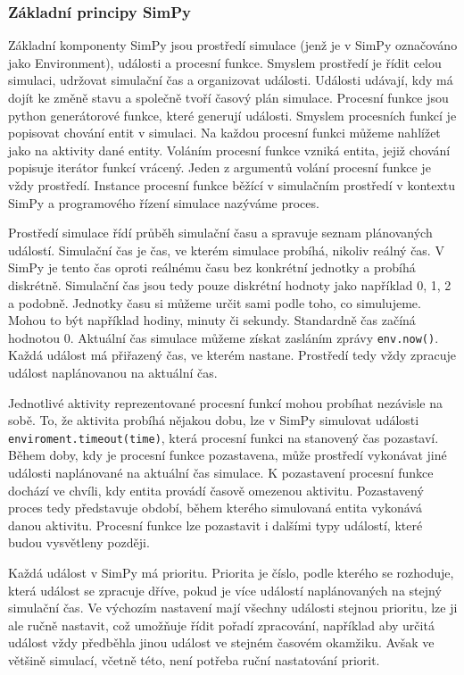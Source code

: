 \documentclass[
  program=itp,
  biblatex,
  figures=false,
  glossaries,
  index
]{kidiplom}
\begin{document}
\subsubsection{Základní principy SimPy}
Základní komponenty SimPy jsou prostředí simulace (jenž je v SimPy označováno jako Environment), události a procesní funkce. Smyslem prostředí je řídit celou simulaci, udržovat simulační čas a organizovat události. Události udávají, kdy má dojít ke změně stavu a společně tvoří časový plán simulace. Procesní funkce jsou python generátorové funkce, které generují události. Smyslem procesních funkcí je popisovat chování entit v simulaci. Na každou procesní funkci můžeme nahlížet jako na aktivity dané entity. Voláním procesní funkce vzniká entita, jejiž chování popisuje iterátor funkcí vrácený. Jeden z argumentů volání procesní funkce je vždy prostředí. Instance procesní funkce běžící v simulačním prostředí v kontextu SimPy a programového řízení simulace nazýváme proces.

Prostředí simulace řídí průběh simulační času a spravuje seznam plánovaných událostí. Simulační čas je čas, ve kterém simulace probíhá, nikoliv reálný čas. V SimPy je tento čas oproti reálnému času bez konkrétní jednotky a probíhá diskrétně. Simulační čas jsou tedy pouze diskrétní hodnoty jako například 0, 1, 2 a podobně. Jednotky času si můžeme určit sami podle toho, co simulujeme. Mohou to být například hodiny, minuty či sekundy. Standardně čas začíná hodnotou 0. Aktuální čas simulace můžeme získat zasláním zprávy \texttt{env.now()}. Každá událost má přiřazený čas, ve kterém nastane. Prostředí tedy vždy zpracuje událost naplánovanou na aktuální čas.

Jednotlivé aktivity reprezentované procesní funkcí mohou probíhat nezávisle na sobě. To, že aktivita probíhá nějakou dobu, lze v SimPy simulovat události \texttt{enviroment.timeout(time)}, která procesní funkci na stanovený čas pozastaví. Během doby, kdy je procesní funkce pozastavena, může prostředí vykonávat jiné události naplánované na aktuální čas simulace. K pozastavení procesní funkce dochází ve chvíli, kdy entita provádí časově omezenou aktivitu. Pozastavený proces tedy představuje období, během kterého simulovaná entita vykonává danou aktivitu. Procesní funkce lze pozastavit i dalšími typy událostí, které budou vysvětleny později.

Každá událost v SimPy má prioritu. Priorita je číslo, podle kterého se rozhoduje, která událost se zpracuje dříve, pokud je více událostí naplánovaných na stejný simulační čas.
Ve výchozím nastavení mají všechny události stejnou prioritu, lze ji ale ručně nastavit, což umožňuje řídit pořadí zpracování, například aby určitá událost vždy předběhla jinou událost ve stejném časovém okamžiku. Avšak ve většině simulací, včetně této, není potřeba ruční nastatování priorit.
\end{document}

